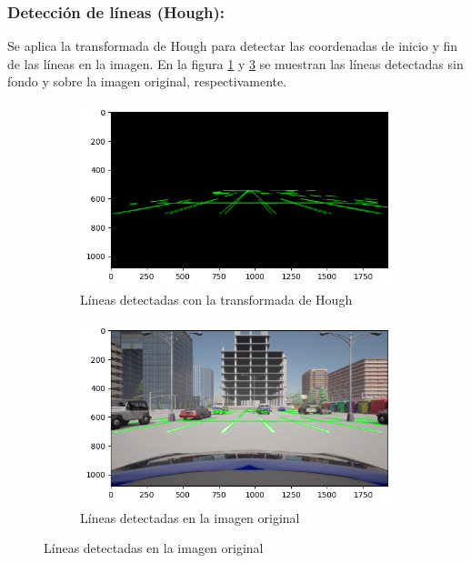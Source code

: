 \subsubsection{Detección de líneas (Hough):}
\noindent
Se aplica la transformada de Hough \cite{ballard1981hough} para detectar las coordenadas de inicio y fin de las líneas en la imagen.
En la figura \ref{fig:hough} y \ref{fig:lines} se muestran las líneas detectadas sin fondo y sobre la imagen original, respectivamente.
\begin{figure}[!ht]
    \begin{subfigure}{0.5\textwidth}
        \includegraphics[width=\textwidth]{img/reticule/hough2}
        \caption{Líneas detectadas con la transformada de Hough}
        \label{fig:hough}
    \end{subfigure}
    \begin{subfigure}{0.5\textwidth}
        \includegraphics[width=\textwidth]{img/reticule/hough}
        \caption{Líneas detectadas en la imagen original}
        \label{fig:lines}
    \end{subfigure}
\end{figure}

